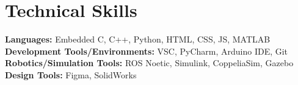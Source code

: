 \section*{Technical Skills}
%
%
%
\begin{tasks}
  \task \textbf{Languages:} Embedded C, C++, Python, HTML, CSS, JS, MATLAB
  \task \textbf{Development Tools/Environments:} VSC, PyCharm, Arduino IDE, Git
  \task \textbf{Robotics/Simulation Tools:} ROS Noetic, Simulink, CoppeliaSim, Gazebo
  \task \textbf{Design Tools:} Figma, SolidWorks
\end{tasks}